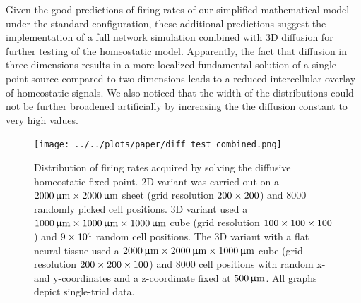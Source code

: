 \documentclass[10pt,letterpaper]{article}
\begin{document}
Given the good predictions of firing rates of our simplified mathematical model under the standard configuration, these additional predictions suggest the implementation of a full network simulation combined with 3D diffusion for further testing of the homeostatic model. Apparently, the fact that diffusion in three dimensions results in a more localized fundamental solution of a single point source compared to two dimensions leads to a reduced intercellular overlay of homeostatic signals. We also noticed that the width of the distributions could not be further broadened artificially by increasing the the diffusion constant to very high values.
\begin{figure}
\texttt{[image: ../../plots/paper/diff\_test\_combined.png]}
\caption{Distribution of firing rates acquired by solving the diffusive homeostatic fixed point. 2D variant was carried out on a $\rm 2000\, \upmu m \times 2000\, \upmu m$ sheet (grid resolution $\rm 200 \times 200$) and $8000$ randomly picked cell positions. 3D variant used a $\rm 1000\, \upmu m \times 1000\, \upmu m \times 1000\, \upmu m$ cube (grid resolution $\rm 100 \times 100 \times 100$) and $\rm 9\times 10^4$ random cell positions. The 3D variant with a flat neural tissue used a $\rm 2000\, \upmu m \times 2000\, \upmu m \times 1000\, \upmu m$ cube (grid resolution $\rm 200 \times 200 \times 100$) and $8000$ cell positions with random x- and y-coordinates and a z-coordinate fixed at $\rm 500\, \upmu m$. All graphs depict single-trial data.}
\label{Large_Diff_Test}
\end{figure}
\end{document}
